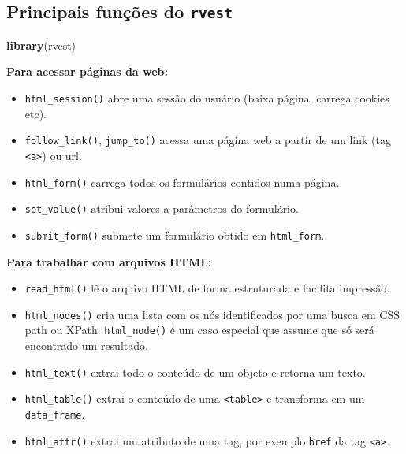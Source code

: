 \documentclass[]{book}
\newenvironment{Shaded}{\begin{snugshade}}{\end{snugshade}}
\newcommand{\KeywordTok}[1]{\textcolor[rgb]{0.13,0.29,0.53}{\textbf{{#1}}}}
\newcommand{\NormalTok}[1]{{#1}}
\providecommand{\tightlist}{%
  \setlength{\itemsep}{0pt}\setlength{\parskip}{0pt}}
\begin{document}
\subsection{\texorpdfstring{Principais funções do
\texttt{rvest}}{Principais funções do rvest}}\label{principais-funcoes-do-rvest}

\begin{Shaded}
\begin{Highlighting}[]
\KeywordTok{library}\NormalTok{(rvest)}
\end{Highlighting}
\end{Shaded}

\textbf{Para acessar páginas da web:}

\begin{itemize}
\tightlist
\item
  \texttt{html\_session()} abre uma sessão do usuário (baixa página,
  carrega cookies etc).
\item
  \texttt{follow\_link()}, \texttt{jump\_to()} acessa uma página web a
  partir de um link (tag \texttt{\textless{}a\textgreater{}}) ou url.
\item
  \texttt{html\_form()} carrega todos os formulários contidos numa
  página.
\item
  \texttt{set\_value()} atribui valores a parâmetros do formulário.
\item
  \texttt{submit\_form()} submete um formulário obtido em
  \texttt{html\_form}.
\end{itemize}

\textbf{Para trabalhar com arquivos HTML:}

\begin{itemize}
\tightlist
\item
  \texttt{read\_html()} lê o arquivo HTML de forma estruturada e
  facilita impressão.
\item
  \texttt{html\_nodes()} cria uma lista com os nós identificados por uma
  busca em CSS path ou XPath. \texttt{html\_node()} é um caso especial
  que assume que só será encontrado um resultado.
\item
  \texttt{html\_text()} extrai todo o conteúdo de um objeto e retorna um
  texto.
\item
  \texttt{html\_table()} extrai o conteúdo de uma
  \texttt{\textless{}table\textgreater{}} e transforma em um
  \texttt{data\_frame}.
\item
  \texttt{html\_attr()} extrai um atributo de uma tag, por exemplo
  \texttt{href} da tag \texttt{\textless{}a\textgreater{}}.
\end{itemize}
\end{document}
